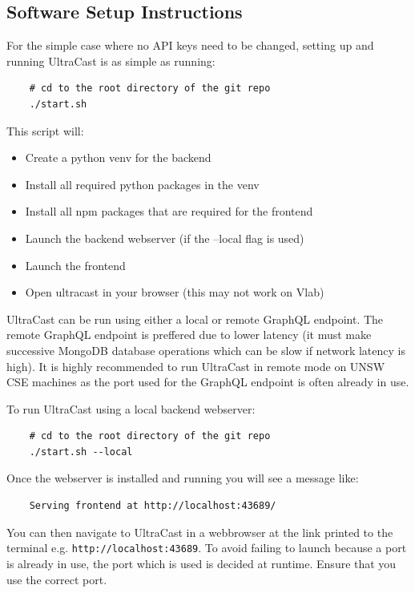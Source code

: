 \documentclass[../report.tex]{subfiles}
\begin{document}
   

\subsection{Software Setup Instructions} \label{ssec:setup_instructions}

For the simple case where no API keys need to be changed, setting up and running UltraCast is as simple as running:

\begin{verbatim}
    # cd to the root directory of the git repo
    ./start.sh
\end{verbatim}
%
This script will: 
\begin{itemize}
    \item Create a python venv for the backend
    \item Install all required python packages in the venv
    \item Install all npm packages that are required for the frontend
    \item Launch the backend webserver (if the --local flag is used)
    \item Launch the frontend
    \item Open ultracast in your browser (this may not work on Vlab)
\end{itemize}

UltraCast can be run using either a local or remote GraphQL endpoint.
The remote GraphQL endpoint is preffered due to lower latency (it must make successive MongoDB database operations which can be slow if network latency is high).
It is highly recommended to run UltraCast in remote mode on UNSW CSE machines as the port used for the GraphQL endpoint is often already in use.

To run UltraCast using a local backend webserver:

\begin{verbatim}
    # cd to the root directory of the git repo
    ./start.sh --local
\end{verbatim}

Once the webserver is installed and running you will see a message like:

\begin{verbatim}
    Serving frontend at http://localhost:43689/
\end{verbatim}

You can then navigate to UltraCast in a webbrowser at the link printed to the terminal e.g. \verb|http://localhost:43689|.
To avoid failing to launch because a port is already in use, the port which is used is decided at runtime. Ensure that you use the correct port.
\end{document}
